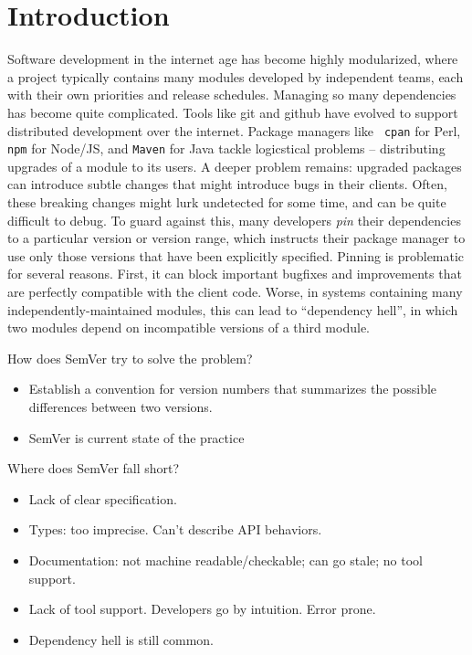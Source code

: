 \section{Introduction}

Software development in the internet age has become highly
modularized, where a project typically contains many modules developed
by independent teams, each with their own priorities and release
schedules. Managing so many dependencies has become quite
complicated. Tools like git and github have evolved to support
distributed development over the internet. Package managers like {\tt
  cpan} for Perl, {\tt npm} for Node/JS, and {\tt Maven} for Java
tackle logicstical problems -- distributing upgrades of a module to
its users. A deeper problem remains: upgraded packages can introduce
subtle changes that might introduce bugs in their clients. Often,
these breaking changes might lurk undetected for some time, and can be
quite difficult to debug. To guard against this, many developers {\em
  pin} their dependencies to a particular version or version range,
which instructs their package manager to use only those versions that
have been explicitly specified. Pinning is problematic for several
reasons. 
%
First, it can block important bugfixes and improvements that are
perfectly compatible with the client code.
%
Worse, in systems containing many independently-maintained modules,
this can lead to ``dependency hell''\cite{hell}, in which two modules
depend on incompatible versions of a third module.


How does SemVer try to solve the problem?
\begin{itemize}
\item Establish a convention for version numbers that summarizes
  the possible differences between two versions.
\item SemVer is current state of the practice
\end{itemize}

Where does SemVer fall short? 
\begin{itemize}
\item Lack of clear specification. 
\item Types: too imprecise. Can't describe API behaviors.
\item Documentation: not machine readable/checkable; can go stale; no tool support.
\item Lack of tool support. Developers go by intuition. Error prone.
\item Dependency hell is still common.
\end{itemize}

